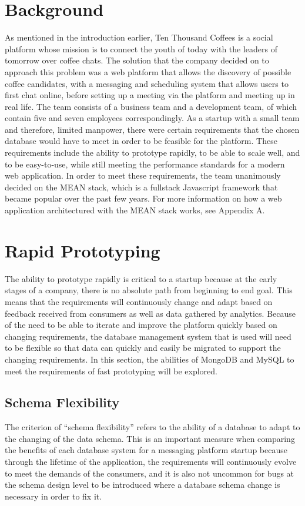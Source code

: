\documentclass[12pt]{article}
\begin{document}
\section{Background}
As mentioned in the introduction earlier, Ten Thousand Coffees is a social platform whose mission is to connect the youth of today with the leaders of tomorrow over coffee chats. The solution that the company decided on to approach this problem was a web platform that allows the discovery of possible coffee candidates, with a messaging and scheduling system that allows users to first chat online, before setting up a meeting via the platform and meeting up in real life. The team consists of a business team and a development team, of which contain five and seven employees correspondingly. As a startup with a small team and therefore, limited manpower, there were certain requirements that the chosen database would have to meet in order to be feasible for the platform. These requirements include the ability to prototype rapidly, to be able to scale well, and to be easy-to-use, while still meeting the performance standards for a modern web application. In order to meet these requirements, the team unanimously decided on the MEAN stack, which is a fullstack Javascript framework that became popular over the past few years. For more information on how a web application architectured with the MEAN stack works, see Appendix A.

\section{Rapid Prototyping}
The ability to prototype rapidly is critical to a startup because at the early stages of a company, there is no absolute path from beginning to end goal. This means that the requirements will continuously change and adapt based on feedback received from consumers as well as data gathered by analytics. Because of the need to be able to iterate and improve the platform quickly based on changing requirements, the database management system that is used will need to be flexible so that data can quickly and easily be migrated to support the changing requirements. In this section, the abilities of MongoDB and MySQL to meet the requirements of fast prototyping will be explored.

\subsection{Schema Flexibility}
The criterion of ``schema flexibility'' refers to the ability of a database to adapt to the changing of the data schema. This is an important measure when comparing the benefits of each database system for a messaging platform startup because through the lifetime of the application, the requirements will continuously evolve to meet the demands of the consumers, and it is also not uncommon for bugs at the schema design level to be introduced where a database schema change is necessary in order to fix it.
\end{document}
